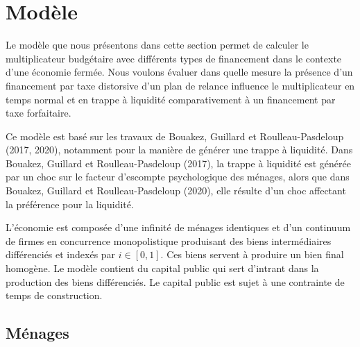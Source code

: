 \documentclass[12pt,letterpaper]{article}
\begin{document}
\section{Modèle}

Le modèle que nous présentons dans cette section permet de calculer le multiplicateur budgétaire avec différents types de financement dans le contexte d’une économie fermée. Nous voulons évaluer dans quelle mesure la présence d’un financement par taxe distorsive d’un plan de relance influence le multiplicateur en temps normal et en trappe à liquidité comparativement à un financement par taxe forfaitaire.

Ce modèle est basé sur les travaux de Bouakez, Guillard et Roulleau-Pasdeloup (2017, 2020), notamment pour la manière de générer une trappe à liquidité. Dans Bouakez, Guillard et Roulleau-Pasdeloup (2017), la trappe à liquidité est générée par un choc sur le facteur d’escompte psychologique des ménages, alors que dans Bouakez, Guillard et Roulleau-Pasdeloup (2020), elle résulte d’un choc affectant la préférence pour la liquidité.

L’économie est composée d’une infinité de ménages identiques et d’un continuum de firmes en concurrence monopolistique produisant des biens intermédiaires différenciés et indexés par $i \in [0,1]$. Ces biens servent à produire un bien final homogène. Le modèle contient du capital public qui sert d’intrant dans la production des biens différenciés. Le capital public est sujet à une contrainte de temps de construction.

\subsection{Ménages}
\end{document}
